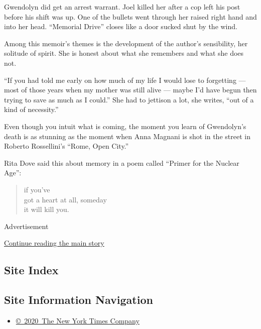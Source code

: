 Gwendolyn did get an arrest warrant. Joel killed her after a cop left
his post before his shift was up. One of the bullets went through her
raised right hand and into her head. ``Memorial Drive'' closes like a
door sucked shut by the wind.

Among this memoir's themes is the development of the author's
sensibility, her solitude of spirit. She is honest about what she
remembers and what she does not.

``If you had told me early on how much of my life I would lose to
forgetting --- most of those years when my mother was still alive ---
maybe I'd have begun then trying to save as much as I could.'' She had
to jettison a lot, she writes, ``out of a kind of necessity.''

Even though you intuit what is coming, the moment you learn of
Gwendolyn's death is as stunning as the moment when Anna Magnani is shot
in the street in Roberto Rossellini's ``Rome, Open City.''

Rita Dove said this about memory in a poem called ``Primer for the
Nuclear Age'':

\begin{quote}
if you've\\
got a heart at all, someday\\
it will kill you.
\end{quote}

Advertisement

\protect\hyperlink{after-bottom}{Continue reading the main story}

\hypertarget{site-index}{%
\subsection{Site Index}\label{site-index}}

\hypertarget{site-information-navigation}{%
\subsection{Site Information
Navigation}\label{site-information-navigation}}

\begin{itemize}
\tightlist
\item
  \href{https://help.nytimes.com/hc/en-us/articles/115014792127-Copyright-notice}{©~2020~The
  New York Times Company}
\end{itemize}

